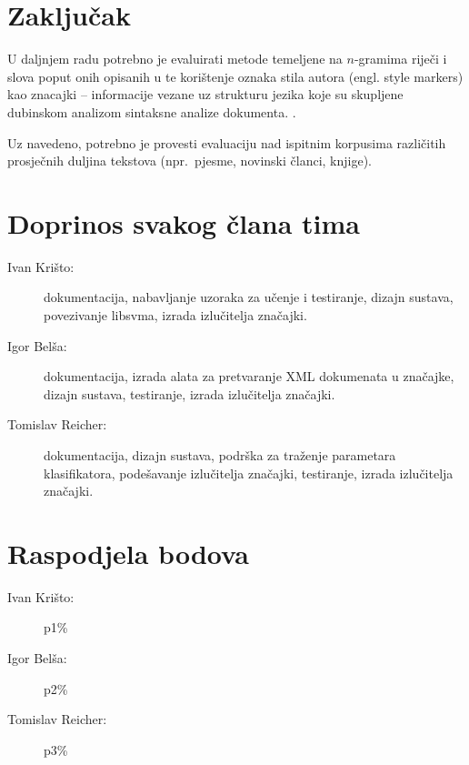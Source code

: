 \documentclass{article}
\begin{document}
\section{Zaključak}


U daljnjem radu potrebno je evaluirati metode temeljene na $n$-gramima riječi i
slova poput onih opisanih u
\citep{keselj2003n,peng2003language,coyotl2006authorship} te korištenje oznaka
stila autora (engl. style markers) kao znacajki – informacije vezane uz strukturu
jezika koje su skupljene dubinskom analizom sintaksne analize dokumenta.
\citep{stamatatos2001computer,diri2003automatic,luyckx2005shallow}.

Uz navedeno, potrebno je provesti evaluaciju nad ispitnim korpusima različitih
prosječnih duljina tekstova (npr.~pjesme, novinski članci, knjige).





\newpage
\appendix
\section{Doprinos svakog člana tima}
\begin{description}
\item[Ivan Krišto:] dokumentacija, nabavljanje uzoraka za učenje i testiranje,
dizajn sustava, povezivanje libsvma, izrada izlučitelja značajki.
\item[Igor Belša:] dokumentacija, izrada alata za pretvaranje XML dokumenata u
značajke, dizajn sustava, testiranje, izrada izlučitelja značajki.
\item[Tomislav Reicher:] dokumentacija, dizajn sustava, podrška za traženje
parametara klasifikatora, podešavanje izlučitelja značajki, testiranje, izrada
izlučitelja značajki.
\end{description}

\section{Raspodjela bodova}
\begin{description}
\item[Ivan Krišto:] p1\%
\item[Igor Belša:] p2\%
\item[Tomislav Reicher:] p3\%
\end{description}
\end{document}
